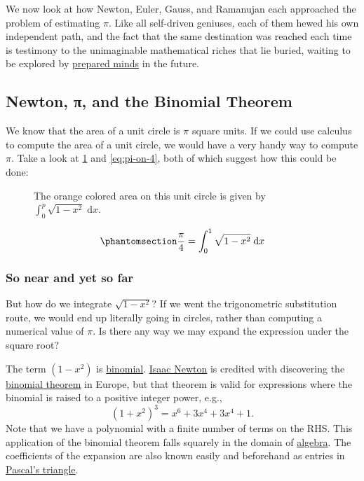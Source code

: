 \documentclass[
  a4paper,
]{article}
\begin{document}
We now look at how Newton, Euler, Gauss, and Ramanujan each approached
the problem of estimating \(\pi\). Like all self-driven geniuses, each
of them hewed his own independent path, and the fact that the same
destination was reached each time is testimony to the unimaginable
mathematical riches that lie buried, waiting to be explored by
\href{https://www.pasteurbrewing.com/louis-pasteur-chance-favors-the-prepared-mind/}{prepared
minds} in the future.

\subsection{Newton, π, and the Binomial
Theorem}\label{newton-ux3c0-and-the-binomial-theorem}

We know that the area of a unit circle is \(\pi\) square units. If we
could use calculus to compute the area of a unit circle, we would have a
very handy way to compute \(\pi\). Take a look at \cref{fig:quadrant}
and \cref{eq:pi-on-4}, both of which suggest how this could be done:

\begin{figure}
\centering

\caption{The orange colored area on this unit circle is given by
\(\displaystyle\int_0^p\sqrt{1-x^2}\;\mathrm{d}x\).}\label{fig:quadrant}
\end{figure}

\begin{equation}\phantomsection\label{eq:pi-on-4}{
\frac{\pi}{4} = \displaystyle\int_0^1\sqrt{1-x^2}\;\mathrm{d}x
}\end{equation}

\subsubsection{So near and yet so far}\label{so-near-and-yet-so-far}

But how do we integrate \(\sqrt{1-x^2}\)? If we went the trigonometric
substitution route, we would end up literally going in circles, rather
than computing a numerical value of \(\pi\). Is there any way we may
expand the expression under the square root?

The term \({(1 - x^2)}\) is
\href{https://www.google.com/search?q=binomial}{binomial}.
\href{https://en.wikipedia.org/wiki/Isaac_Newton}{Isaac Newton} is
credited with discovering the
\href{https://www.mathsisfun.com/algebra/binomial-theorem.html}{binomial
theorem} in Europe, but that theorem is valid for expressions where the
binomial is raised to a positive integer power, e.g., \[
(1 + x^2)^3 = x^6 + 3x^4 + 3x^4 +1.
\] Note that we have a polynomial with a finite number of terms on the
RHS. This application of the binomial theorem falls squarely in the
domain of \href{https://www.britannica.com/science/algebra}{algebra}.
The coefficients of the expansion are also known easily and beforehand
as entries in
\href{https://www.britannica.com/science/Pascals-triangle}{Pascal's
triangle}.
\end{document}
